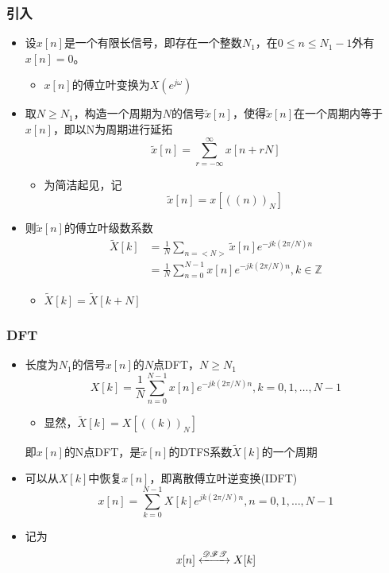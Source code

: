 \documentclass[CJKutf8,dvipsnames,table]{beamer}
\begin{document}
\begin{CJK*}{UTF8}{song}
  \begin{frame}
    \frametitle{引入}
    \begin{itemize}
    \item 设$x[n]$是一个有限长信号，即存在一个整数$N_1$，在$0\leq n \leq N_1 - 1$外有$x[n]=0$。
    	\begin{itemize}
    	\item $x[n]$的傅立叶变换为$X(e^{j\omega})$
    	\end{itemize}
	\item 取$N\geq N_1$，构造一个周期为$N$的信号$\tilde{x}[n]$，使得$\tilde{x}[n]$在一个周期内等于$x[n]$，即以N为周期进行延拓
		\[
			\tilde{x}[n]=\sum_{r=-\infty}^{\infty} x[n+rN]
		\]
		\begin{itemize}
		\item 为简洁起见，记
		\[
			\tilde{x}[n]=x[((n))_N]
		\]
		\end{itemize}
	\item 则$\tilde{x}[n]$的傅立叶级数系数
		\begin{align*}
			\tilde{X}[k] & = \frac{1}{N}\sum_{n=<N>} \tilde{x}[n] e^{-jk(2\pi/N)n} \\
		    	& = \frac{1}{N}\sum_{n=0}^{N-1} x[n] e^{-jk(2\pi/N)n}, k \in \mathbb{Z}
		\end{align*}
		\begin{itemize}
		\item $\tilde{X}[k]=\tilde{X}[k+N]$
		\end{itemize}
    \end{itemize}
  \end{frame} 	

  \begin{frame}
    \frametitle{DFT}
    \begin{itemize}
	\item 长度为$N_1$的信号$x[n]$的$N$点DFT，$N \geq N_1$
		\[
			X[k] = \frac{1}{N}\sum_{n=0}^{N-1} x[n] e^{-jk(2\pi/N)n}, k=0, 1, \hdots, N-1
		\]
		\begin{itemize}
		\item 显然，$\tilde{X}[k]=X[((k))_N]$
		\end{itemize}
	{\color{red}即$x[n]$的N点DFT，是$\tilde{x}[n]$的DTFS系数$\tilde{X}[k]$的一个周期}
	\item 可以从$X[k]$中恢复$x[n]$，即离散傅立叶逆变换(IDFT)
		\[
			x[n] = \sum_{k=0}^{N-1} X[k] e^{jk(2\pi/N)n}, n=0, 1, \hdots, N-1
		\]
	\item 记为
		\[
			x[n] \xleftrightarrow{\mathscr{DFT}} X[k]
		\]	
    \end{itemize}
  \end{frame} 	
	

\end{CJK*}
\end{document}
